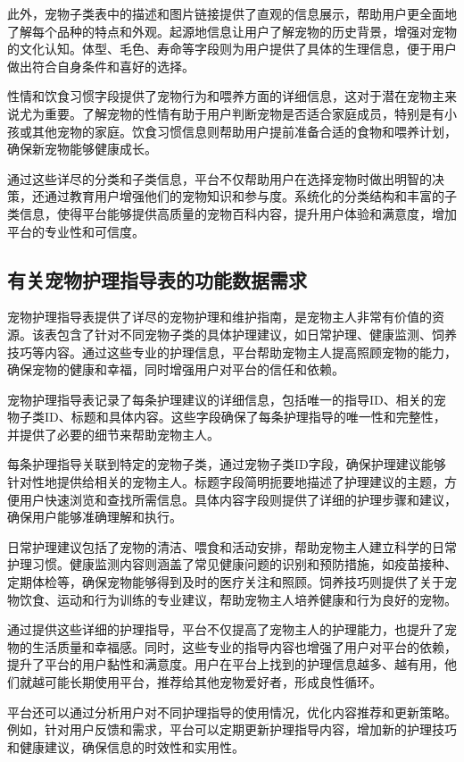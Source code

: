 此外，宠物子类表中的描述和图片链接提供了直观的信息展示，帮助用户更全面地了解每个品种的特点和外观。起源地信息让用户了解宠物的历史背景，增强对宠物的文化认知。体型、毛色、寿命等字段则为用户提供了具体的生理信息，便于用户做出符合自身条件和喜好的选择。

性情和饮食习惯字段提供了宠物行为和喂养方面的详细信息，这对于潜在宠物主来说尤为重要。了解宠物的性情有助于用户判断宠物是否适合家庭成员，特别是有小孩或其他宠物的家庭。饮食习惯信息则帮助用户提前准备合适的食物和喂养计划，确保新宠物能够健康成长。

通过这些详尽的分类和子类信息，平台不仅帮助用户在选择宠物时做出明智的决策，还通过教育用户增强他们的宠物知识和参与度。系统化的分类结构和丰富的子类信息，使得平台能够提供高质量的宠物百科内容，提升用户体验和满意度，增加平台的专业性和可信度。

\subsection{有关宠物护理指导表的功能数据需求}

宠物护理指导表提供了详尽的宠物护理和维护指南，是宠物主人非常有价值的资源。该表包含了针对不同宠物子类的具体护理建议，如日常护理、健康监测、饲养技巧等内容。通过这些专业的护理信息，平台帮助宠物主人提高照顾宠物的能力，确保宠物的健康和幸福，同时增强用户对平台的信任和依赖。

宠物护理指导表记录了每条护理建议的详细信息，包括唯一的指导ID、相关的宠物子类ID、标题和具体内容。这些字段确保了每条护理指导的唯一性和完整性，并提供了必要的细节来帮助宠物主人。

每条护理指导关联到特定的宠物子类，通过宠物子类ID字段，确保护理建议能够针对性地提供给相关的宠物主人。标题字段简明扼要地描述了护理建议的主题，方便用户快速浏览和查找所需信息。具体内容字段则提供了详细的护理步骤和建议，确保用户能够准确理解和执行。

日常护理建议包括了宠物的清洁、喂食和活动安排，帮助宠物主人建立科学的日常护理习惯。健康监测内容则涵盖了常见健康问题的识别和预防措施，如疫苗接种、定期体检等，确保宠物能够得到及时的医疗关注和照顾。饲养技巧则提供了关于宠物饮食、运动和行为训练的专业建议，帮助宠物主人培养健康和行为良好的宠物。

通过提供这些详细的护理指导，平台不仅提高了宠物主人的护理能力，也提升了宠物的生活质量和幸福感。同时，这些专业的指导内容也增强了用户对平台的依赖，提升了平台的用户黏性和满意度。用户在平台上找到的护理信息越多、越有用，他们就越可能长期使用平台，推荐给其他宠物爱好者，形成良性循环。

平台还可以通过分析用户对不同护理指导的使用情况，优化内容推荐和更新策略。例如，针对用户反馈和需求，平台可以定期更新护理指导内容，增加新的护理技巧和健康建议，确保信息的时效性和实用性。

